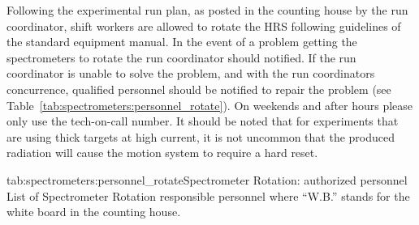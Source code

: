 
Following the experimental run plan, as posted in the counting house
by the run coordinator, shift workers are allowed to rotate the HRS
following guidelines of the standard equipment manual.  In the event
of a problem getting the spectrometers to rotate the run coordinator
should notified.  If the run coordinator is unable to solve the
problem, and with the run coordinators concurrence, qualified
personnel should be notified to repair the problem (see
Table~\ref{tab:spectrometers:personnel_rotate}).  On weekends and after hours
please only use the tech-on-call number.  It should be noted that for
experiments that are using thick targets at high current, it is not
uncommon that the produced radiation will cause the motion system to
require a hard reset.

\begin{namestab}{tab:spectrometers:personnel_rotate}{Spectrometer Rotation: authorized personnel}{%
      List of Spectrometer Rotation responsible personnel where ``W.B.'' stands for the white board 
      in the counting house.}
   \MikeFowler{}
   \WalterKellner{}
   \AndyKenyon{}
   \JoeBeaufait{}
\end{namestab}


